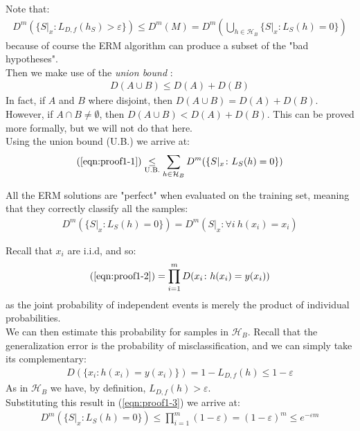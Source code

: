 \documentclass[../template.tex]{subfiles}
\begin{document}
Note that:
\begin{align}
    D^m(\{S|_x \colon L_{D,f}(h_S) > \varepsilon \}) \leq D^m(M) = D^m \left( \bigcup_{h \in \mathcal{H}_B} \{S|_x \colon L_S(h) = 0 \}\right)
    \label{eqn:proof1-1}
\end{align}
because of course the ERM algorithm can produce a subset of the "bad hypotheses".\\
Then we make use of the \textit{union bound} :
\begin{align*}
    D(A \cup B) \leq D(A) + D(B)
\end{align*}
In fact, if $A$ and $B$ where disjoint, then $D(A\cup B) = D(A) + D(B)$. However, if $A\cap B \neq \emptyset $, then $D(A \cup B) < D(A) + D(B)$. This can be proved more formally, but we will not do that here.\\

Using the union bound (U.B.) we arrive at:
\begin{align*}
    (\ref{eqn:proof1-1})\underset{\mathrm{U.B.} }{\leq} \sum_{h \in \mathcal{H}_B } D^m(\{S|_x \colon L_S(h) = 0 \}) 
\end{align*}

All the ERM solutions are "perfect" when evaluated on the training set, meaning that they correctly classify all the samples:
\begin{align}
    D^m(\{S|_x \colon L_S(h) = 0 \}) = D^m(S|_x \colon \forall i \> h(x_i) = x_i)
    \label{eqn:proof1-2}
\end{align}

Recall that $x_i$ are i.i.d, and so:
\begin{align}
   (\ref{eqn:proof1-2}) = \prod_{i=1}^m D(x_i \colon h(x_i) = y(x_i))
   \label{eqn:proof1-3}
\end{align}  
as the joint probability of independent events is merely the product of individual probabilities.\\

We can then estimate this probability for samples in $\mathcal{H}_B$. Recall that the generalization error is the probability of misclassification, and we can simply take its complementary: 
\begin{align*}
    D(\{x_i \colon h(x_i) = y(x_i)\}) = 1-L_{D,f}(h) \leq 1-\varepsilon
\end{align*}
As in $\mathcal{H}_B$ we have, by definition, $L_{D,f}(h) > \varepsilon$.\\

Substituting this result in (\ref{eqn:proof1-3}) we arrive at:
\begin{align*}
    D^m(\{S|_x \colon L_S(h) = 0\}) \leq \prod_{i=1}^m (1-\varepsilon) = (1-\varepsilon)^m \leq e^{-\varepsilon m}
\end{align*}
\end{document}
